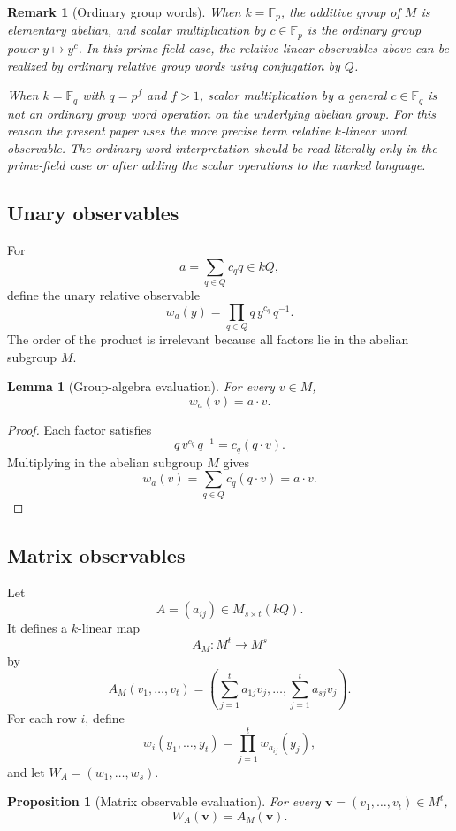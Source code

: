 \documentclass[11pt]{article}
\newtheorem{proposition}[theorem]{Proposition}
\newtheorem{lemma}[theorem]{Lemma}
\newtheorem{remark}[theorem]{Remark}
\begin{document}
\begin{remark}[Ordinary group words]
When $k=\mathbb F_p$, the additive group of $M$ is elementary abelian, and scalar multiplication by $c\in\mathbb F_p$ is the ordinary group power $y\mapsto y^c$. In this prime-field case, the relative linear observables above can be realized by ordinary relative group words using conjugation by $Q$.

When $k=\mathbb F_q$ with $q=p^f$ and $f>1$, scalar multiplication by a general $c\in\mathbb F_q$ is not an ordinary group word operation on the underlying abelian group. For this reason the present paper uses the more precise term relative $k$-linear word observable. The ordinary-word interpretation should be read literally only in the prime-field case or after adding the scalar operations to the marked language.
\end{remark}

\subsection{Unary observables}

For
\[
a=\sum_{q\in Q}c_q q\in kQ,
\]
define the unary relative observable
\[
w_a(y)=\prod_{q\in Q}q\, y^{c_q}\,q^{-1}.
\]
The order of the product is irrelevant because all factors lie in the abelian subgroup $M$.

\begin{lemma}[Group-algebra evaluation]
For every $v\in M$,
\[
w_a(v)=a\cdot v.
\]
\end{lemma}

\begin{proof}
Each factor satisfies
\[
q\,v^{c_q}\,q^{-1}=c_q(q\cdot v).
\]
Multiplying in the abelian subgroup $M$ gives
\[
w_a(v)=\sum_{q\in Q}c_q(q\cdot v)=a\cdot v.
\]
\end{proof}

\subsection{Matrix observables}

Let
\[
A=(a_{ij})\in M_{s\times t}(kQ).
\]
It defines a $k$-linear map
\[
A_M:M^t\to M^s
\]
by
\[
A_M(v_1,\ldots,v_t)
=
\left(
\sum_{j=1}^t a_{1j}v_j,\ldots,
\sum_{j=1}^t a_{sj}v_j
\right).
\]
For each row $i$, define
\[
w_i(y_1,\ldots,y_t)=\prod_{j=1}^t w_{a_{ij}}(y_j),
\]
and let $W_A=(w_1,\ldots,w_s)$.

\begin{proposition}[Matrix observable evaluation]
For every $\mathbf v=(v_1,\ldots,v_t)\in M^t$,
\[
W_A(\mathbf v)=A_M(\mathbf v).
\]
\end{proposition}
\end{document}
